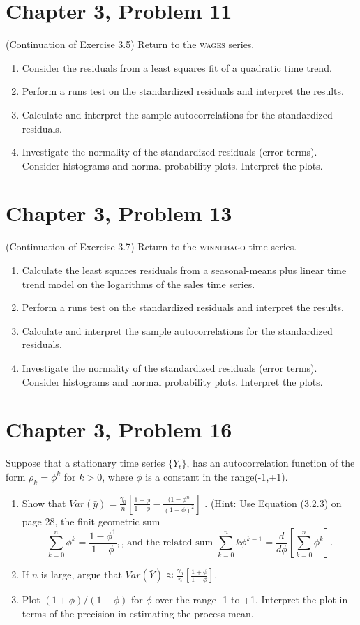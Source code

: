 \documentclass[11pt]{article}
\newif\ifclearpage
\newcommand{\problem}[1]{\section*{#1}}
\newcommand{\solution}{\hrulefill}
\newcommand{\maybeclearpage}{\ifclearpage\clearpage\fi}
\begin{document}
\problem{Chapter 3, Problem 11}
(Continuation of  Exercise 3.5) Return to the \textsc{wages} series.
\begin{enumerate}
	\item Consider the residuals from a least squares fit of a quadratic time trend.
	\item Perform a runs test on the standardized residuals and interpret the results.
	\item Calculate and interpret the sample autocorrelations for the standardized residuals.
	\item Investigate the normality of the standardized residuals (error terms). Consider histograms and normal probability plots. Interpret the plots. 
\end{enumerate}

\solution


\maybeclearpage
\problem{Chapter 3, Problem 13}
(Continuation of Exercise 3.7) Return to the \textsc{winnebago} time series.
\begin{enumerate}
	\item Calculate the least squares residuals from a seasonal-means plus linear time trend model on the logarithms of the sales time series.
	\item Perform a runs test on the standardized residuals and interpret the results.
	\item Calculate and interpret the sample autocorrelations for the standardized residuals.
	\item Investigate the normality of the standardized residuals (error terms). Consider histograms and normal probability plots. Interpret the plots. 
\end{enumerate}

\solution



\maybeclearpage
\problem{Chapter 3, Problem 16}
Suppose that a stationary time series $\{Y_t\}$, has an autocorrelation function of the form $\rho_k = \phi^k$ for $k > 0$, where $\phi$ is a constant in the range(-1,+1). 
\begin{enumerate}
	\item Show that $Var(\bar{y}) = \frac{\gamma_0}{n} \left[ \frac{1+\phi}{1-\phi} - \frac{(1-\phi^n}{(1-\phi)^2} \right] $ . (Hint: Use Equation (3.2.3) on page 28, the finit geometric sum $$\sum_{k=0}^n \phi^k = \frac{1-\phi^{1}}{1-\phi}, \text{, and the related sum } \sum_{k=0}^n k\phi^{k-1} = \frac{d}{d\phi} \left[ \sum_{k=0}^n \phi^k \right].$$
	\item If $n$ is large, argue that $Var(\bar{Y}) \approx \frac{\gamma_0}{n} \left[ \frac{1+\phi}{1-\phi} \right]$. 
	\item Plot $(1+\phi)/(1-\phi)$ for $\phi$ over the range -1 to +1. Interpret the plot in terms of the precision in estimating the process mean.
\end{enumerate}
\solution
\end{document}
